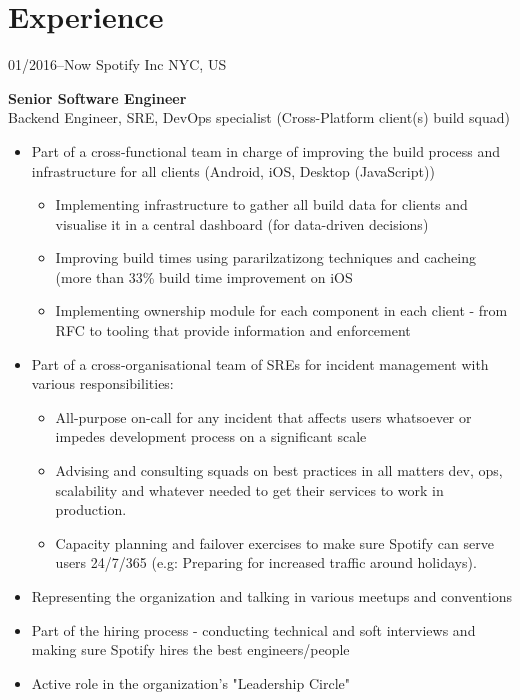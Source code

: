 \documentclass[]{friggeri-cv} %
\begin{document}
\section{Experience}
\begin{entrylist}
\entry
{01/2016--Now}
{Spotify Inc}
{NYC, US}
{\textbf{Senior Software Engineer} \\
Backend Engineer, SRE, DevOps specialist (Cross-Platform client(s) build squad)
\begin{itemize}
\item Part of a cross-functional team in charge of improving the build process and infrastructure for all clients (Android, iOS, Desktop (JavaScript))
\begin{itemize}
\item Implementing infrastructure to gather all build data for clients and visualise it in a central dashboard (for data-driven decisions)
\item Improving build times using pararilzatizong techniques and cacheing (more than 33\% build time improvement on iOS
\item Implementing ownership module for each component in each client - from RFC to tooling that provide information and enforcement
\end{itemize}
\item Part of a cross-organisational team of SREs for incident management with various responsibilities:
\begin{itemize}
\item All-purpose on-call for any incident that affects users whatsoever or impedes development process on a significant scale
\item Advising and consulting squads on best practices in all matters dev, ops, scalability and whatever needed to get their services to work in production.
\item Capacity planning and failover exercises to make sure Spotify can serve users 24/7/365 (e.g: Preparing for increased traffic around holidays).
\end{itemize}
\item Representing the organization and talking in various meetups and conventions
\item Part of the hiring process - conducting technical and soft interviews and making sure Spotify hires the best engineers/people
\item Active role in the organization's "Leadership Circle"
\end{itemize}}
\\
\end{entrylist}
\end{document}
